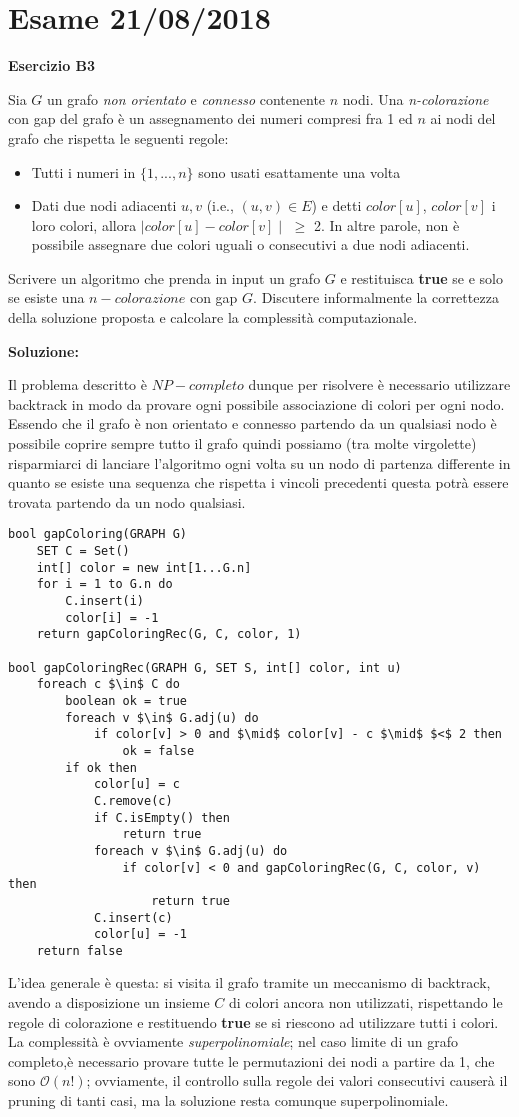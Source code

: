 \documentclass[../cheatSheetAlgoritmi.tex]{subfiles}
\begin{document}
\section{Esame 21/08/2018}
\textbf{Esercizio B3}

Sia $G$ un grafo \emph{non orientato} e \emph{connesso} contenente $n$ nodi. Una \emph{n-colorazione} con gap del grafo è un assegnamento dei numeri compresi fra 1 ed $n$ ai nodi del grafo che rispetta le seguenti regole:
\begin{itemize}
	\item Tutti i numeri in $\{1,...,n\}$ sono usati esattamente una volta
	\item Dati due nodi adiacenti $u, v$ (i.e., $(u, v) \in E$) e detti $color[u]$, $color[v]$ i  loro  colori,  allora $\mid color[u] - color[v] \mid$ $\geq$ 2. In altre parole, non è possibile assegnare due colori uguali o consecutivi a due nodi adiacenti.
\end{itemize}
Scrivere un algoritmo che prenda in input un grafo $G$ e restituisca \textbf{true} se e solo se esiste una $n-colorazione$ con gap $G$. Discutere informalmente la correttezza   della soluzione proposta e calcolare la complessità computazionale.

\textbf{Soluzione:}

Il problema descritto è $NP-completo$ dunque per risolvere è necessario utilizzare backtrack in modo da provare ogni possibile associazione di colori per ogni nodo. Essendo che il grafo è non orientato e connesso partendo da un qualsiasi nodo è possibile coprire sempre tutto il grafo quindi possiamo (tra molte virgolette) risparmiarci di lanciare l'algoritmo ogni volta su un nodo di partenza differente in quanto se esiste una sequenza che rispetta i vincoli precedenti questa potrà essere trovata partendo da un nodo qualsiasi.
\begin{lstlisting}[caption=n-Colorazione (gapColoring)]
bool gapColoring(GRAPH G)
	SET C = Set()
	int[] color = new int[1...G.n]
	for i = 1 to G.n do
		C.insert(i)
		color[i] = -1
	return gapColoringRec(G, C, color, 1)
	
bool gapColoringRec(GRAPH G, SET S, int[] color, int u)
	foreach c $\in$ C do
		boolean ok = true
		foreach v $\in$ G.adj(u) do
			if color[v] > 0 and $\mid$ color[v] - c $\mid$ $<$ 2 then
				ok = false
		if ok then
			color[u] = c
			C.remove(c)
			if C.isEmpty() then
				return true
			foreach v $\in$ G.adj(u) do
				if color[v] < 0 and gapColoringRec(G, C, color, v) then
					return true
			C.insert(c)
			color[u] = -1
	return false
\end{lstlisting}
L'idea generale è questa: si visita il grafo tramite un meccanismo di backtrack, avendo a disposizione un insieme $C$ di colori ancora non utilizzati, rispettando le regole di colorazione e restituendo \textbf{true} se si riescono ad utilizzare tutti i colori. La complessità è ovviamente \emph{superpolinomiale}; nel caso limite di un grafo completo,è necessario provare tutte le permutazioni dei nodi a partire da 1, che sono $\mathcal{O}(n!)$; ovviamente, il controllo sulla regole dei valori consecutivi causerà il pruning di tanti casi, ma la soluzione resta comunque superpolinomiale.
 
\end{document}
